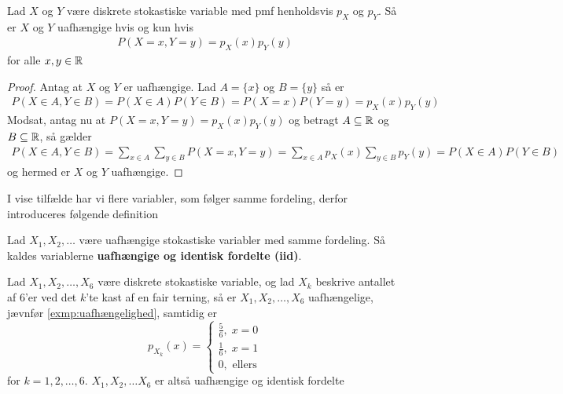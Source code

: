 \begin{prop} \label{prop:prop3.9} %
    Lad $X$ og $Y$ være diskrete stokastiske variable med pmf henholdsvis $p_X$ og $p_Y$. Så er $X$ og $Y$ uafhængige hvis og kun hvis 
    \begin{align*}
        P(X = x, Y = y)=p_X(x)p_Y(y) 
    \end{align*}
for alle $x,y\in \mathbb{R}$
\end{prop}
\begin{proof}
    Antag at $X$ og $Y$ er uafhængige. Lad $A=\{x \}$ og $B=\{y \}$ så er
    \begin{align*}
        P(X \in A,Y \in B)=P(X \in A)P(Y \in B)= P(X = x)P(Y = y) = p_X(x)p_Y(y)
    \end{align*}
Modsat, antag nu at $P(X = x, Y = y) = p_X(x)p_Y(y)$ og betragt $A\subseteq \mathbb{R}$ og $B\subseteq \mathbb{R}$, så gælder  
\begin{align*}
    P(X\in A, Y\in B)=\sum_{x\in A}\sum_{y\in B}P(X = x, Y =y) =\sum_{x\in A}p_X(x)\sum_{y\in B}p_Y(y)=P(X\in A)P(Y\in B)
\end{align*}
og hermed er $X$ og $Y$ uafhængige.
\end{proof}
I vise tilfælde har vi flere variabler, som følger samme fordeling, derfor introduceres følgende definition
\begin{defn} %
    Lad $X_1,X_2,\ldots$ være uafhængige stokastiske variabler med samme fordeling. Så kaldes variablerne  \textbf{uafhængige og identisk fordelte (iid)}.
\end{defn}
\begin{exmp}
    Lad $X_1, X_2, \ldots, X_6$ være diskrete stokastiske variable, og lad $X_k$ beskrive antallet af 6'er ved det $k$'te kast af en fair terning, så er $X_1, X_2, \ldots, X_6$ uafhængelige, jævnfør \ref{exmp:uafhængelighed}, samtidig er 
    \begin{equation*}
        p_{X_k}(x) = \begin{cases}
            \frac{5}{6}, \; x = 0\\
            \frac{1}{6}, \; x = 1\\
            0, \text{ ellers}
        \end{cases}
    \end{equation*} 
    for $k = 1, 2, \ldots, 6$. $X_1, X_2, \ldots X_6$ er altså uafhængige og identisk fordelte   
\end{exmp}

